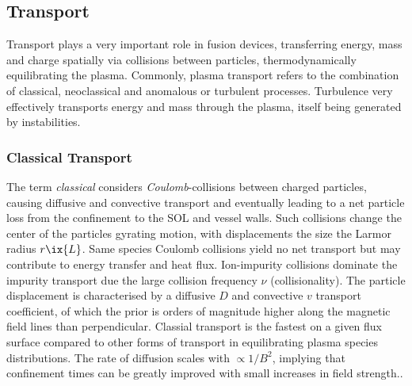         \subsection{Transport}\label{subsec:tranport}%
%
            Transport plays a very important role in fusion devices, transferring energy, mass and charge spatially via collisions between particles, thermodynamically equilibrating the plasma. Commonly, plasma transport refers to the combination of classical, neoclassical and anomalous or turbulent processes. Turbulence very effectively transports energy and mass through the plasma, itself being generated by instabilities.%
%
            \subsubsection*{Classical Transport}%
%
                The term \textit{classical} considers \textit{Coulomb}-collisions between charged particles, causing diffusive and convective transport and eventually leading to a net particle loss from the confinement to the SOL and vessel walls. Such collisions change the center of the particles gyrating motion, with displacements the size the Larmor radius $r\ix{L}$. Same species Coulomb collisions yield no net transport but may contribute to energy transfer and heat flux. Ion-impurity collisions dominate the impurity transport due the large collision frequency $\nu$ (collisionality). The particle displacement is characterised by a diffusive $D$ and convective $v$ transport coefficient, of which the prior is orders of magnitude higher along the magnetic field lines than perpendicular. Classial transport is the fastest on a given flux surface compared to other forms of transport in equilibrating plasma species distributions. The rate of diffusion scales with $\propto1/B^{2}$, implying that confinement times can be greatly improved with small increases in field strength.\cite{Chen1984}.
%
